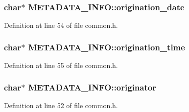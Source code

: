 \subsubsection[{\texorpdfstring{origination\+\_\+date}{origination_date}}]{ char$\ast$ M\+E\+T\+A\+D\+A\+T\+A\+\_\+\+I\+N\+F\+O\+::origination\+\_\+date}\hypertarget{struct_m_e_t_a_d_a_t_a___i_n_f_o_a1c51ce50c4f744680d2fe554f21c0fe2}{}\label{struct_m_e_t_a_d_a_t_a___i_n_f_o_a1c51ce50c4f744680d2fe554f21c0fe2}


Definition at line 54 of file common.\+h.

\subsubsection[{\texorpdfstring{origination\+\_\+time}{origination_time}}]{ char$\ast$ M\+E\+T\+A\+D\+A\+T\+A\+\_\+\+I\+N\+F\+O\+::origination\+\_\+time}\hypertarget{struct_m_e_t_a_d_a_t_a___i_n_f_o_acf9e627834e270f8db2ad94423433913}{}\label{struct_m_e_t_a_d_a_t_a___i_n_f_o_acf9e627834e270f8db2ad94423433913}


Definition at line 55 of file common.\+h.

\subsubsection[{\texorpdfstring{originator}{originator}}]{ char$\ast$ M\+E\+T\+A\+D\+A\+T\+A\+\_\+\+I\+N\+F\+O\+::originator}\hypertarget{struct_m_e_t_a_d_a_t_a___i_n_f_o_a7d7ffd7a4dc38f5182ce554f9f832ad1}{}\label{struct_m_e_t_a_d_a_t_a___i_n_f_o_a7d7ffd7a4dc38f5182ce554f9f832ad1}


Definition at line 52 of file common.\+h.

